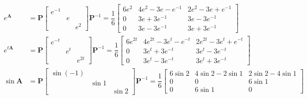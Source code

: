 \begin{align*}
    e^{\bm{A}}  & = \bm{P}\begin{bmatrix}
                              e^{-1} &   &     \\
                                     & e &     \\
                                     &   & e^2
                          \end{bmatrix} \bm{P}^{-1} = \dfrac{1}{6}
    \begin{bmatrix}
        6e^2 & 4e^2 -3e - e^{-1} & 2e^2 - 3e + e^{-1} \\
        0    & 3e + 3e^{-1}      & 3e - 3e^{-1}       \\
        0    & 3e - 3e^{-1}      & 3e + 3e^{-1}
    \end{bmatrix}                  \\
    e^{t\bm{A}} & = \bm{P}\begin{bmatrix}
                              e^{-t} &     &        \\
                                     & e^t &        \\
                                     &     & e^{2t}
                          \end{bmatrix} \bm{P}^{-1} = \dfrac{1}{6}
    \begin{bmatrix}
        6e^{2t} & 4e^{2t} -3e^t - e^{-t} & 2e^{2t} - 3e^t + e^{-t} \\
        0       & 3e^t + 3e^{-t}         & 3e^t - 3e^{-t}          \\
        0       & 3e^t - 3e^{-t}         & 3e^t + 3e^{-t}
    \end{bmatrix}     \\
    \sin\bm{A} &= \bm{P}\begin{bmatrix}
                           \sin(-1) &       &       \\
                                    & \sin1 &       \\
                                    &       & \sin2
                       \end{bmatrix} \bm{P}^{-1} = \dfrac{1}{6}
    \begin{bmatrix}
        6\sin2 & 4\sin2 - 2\sin1 & 2\sin2 - 4\sin1 \\
        0      & 0               & 6\sin1          \\
        0      & 6\sin1          & 0
    \end{bmatrix}
\end{align*}

